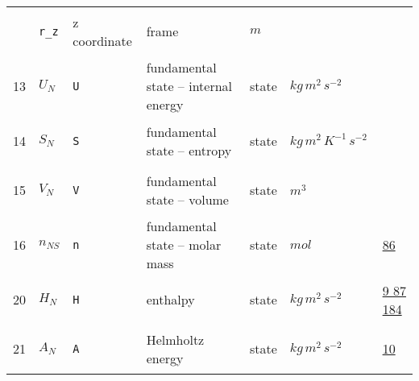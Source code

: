 \begin{longtable}{|p{1cm}|p{2.5cm}|p{4.5cm}|p{8cm}|p{3.0cm}|p{3cm}|p{1cm}|}
             & \verb|r_z|
             & z coordinate
             & \begin{lay}frame \end{lay}
             & $ m  $
             & \\
            13
             & \hypertarget{"v:13"}{ $ {U}{_{N}} $}
             & \verb|U|
             & fundamental state -- internal energy
             & \begin{lay}state \end{lay}
             & $ kg \,m^{2} \,s^{-2} \, $
             & \\
            14
             & \hypertarget{"v:14"}{ $ {S}{_{N}} $}
             & \verb|S|
             & fundamental state -- entropy
             & \begin{lay}state \end{lay}
             & $ kg \,m^{2} \,K^{-1} \,s^{-2} \, $
             & \\
            15
             & \hypertarget{"v:15"}{ $ {V}{_{N}} $}
             & \verb|V|
             & fundamental state -- volume
             & \begin{lay}state \end{lay}
             & $ m^{3} \, $
             & \\
            16
             & \hypertarget{"v:16"}{ $ {n}{_{{N S}}} $}
             & \verb|n|
             & fundamental state -- molar mass
             & \begin{lay}state \end{lay}
             & $ mol \, $
             &                 \hyperlink{"e:86"}{ 86 }
                 \\
            20
             & \hypertarget{"v:20"}{ $ {H}{_{N}} $}
             & \verb|H|
             & enthalpy
             & \begin{lay}state \end{lay}
             & $ kg \,m^{2} \,s^{-2} \, $
             &                 \hyperlink{"e:9"}{ 9 }
                                 \hyperlink{"e:87"}{ 87 }
                                 \hyperlink{"e:184"}{ 184 }
                 \\
            21
             & \hypertarget{"v:21"}{ $ {A}{_{N}} $}
             & \verb|A|
             & Helmholtz energy
             & \begin{lay}state \end{lay}
             & $ kg \,m^{2} \,s^{-2} \, $
             &                 \hyperlink{"e:10"}{ 10 }
                 \\

\end{longtable}
